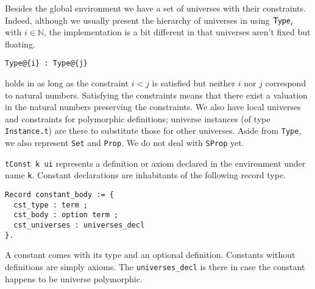 
Besides the global environment we have a set of universes with their
constraints. Indeed, although we usually present the hierarchy of universes in
\Coq using \(\mathsf{Type}_i\) with \(i \in \mathbb{N}\), the implementation is a bit
different in that universes aren't fixed but floating.
\begin{verbatim}
Type@{i} : Type@{j}
\end{verbatim}
holds in \Coq as long as the constraint \(i < j\) is satisfied but neither \(i\)
nor \(j\) correspond to natural numbers. Satisfying the constraints means that
there exist a valuation in the natural numbers preserving the constraints.
We also have local universes and constraints for polymorphic definitions;
universe instances (of type \texttt{Instance.t}) are there to
substitute those for other universes.
Aside from \texttt{Type}, we also represent \texttt{Set}
and \texttt{Prop}. We do not deal with \texttt{SProp} yet.


\texttt{tConst k ui} represents a definition or axiom declared in the
environment under name \texttt{k}. Constant declarations are
inhabitants of the following record type.
\begin{verbatim}
Record constant_body := {
  cst_type : term ;
  cst_body : option term ;
  cst_universes : universes_decl
}.
\end{verbatim}
A constant comes with its type and an optional definition. Constants without
definitions are simply axioms.
The \texttt{universes_decl} is there in case the constant happens to
be universe polymorphic.


